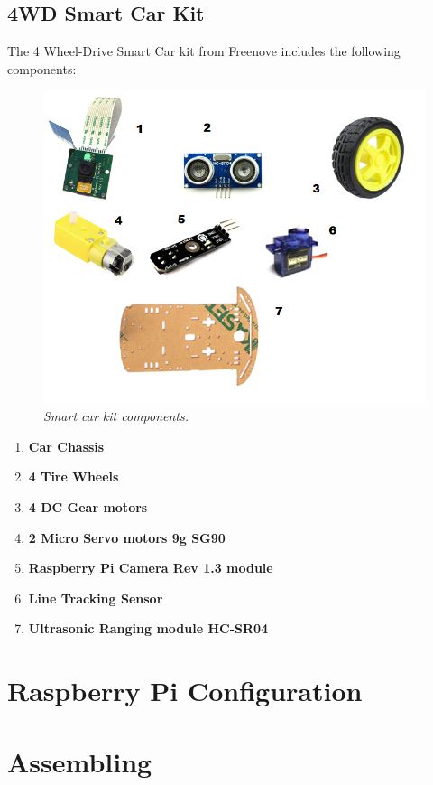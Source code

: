 \documentclass[12pt,a4paper]{article}
\begin{document}
    \subsection{4WD Smart Car Kit}
    The 4 Wheel-Drive Smart Car kit from Freenove includes the following components:
     \begin{figure}[h]
     	\centering
     	\includegraphics[width=0.6\linewidth]{Imm/Kit}
     	\caption{\textit{Smart car kit components.}}
     	\label{fig: Kit}
     \end{figure}
    \begin{enumerate}
    	\item \textbf{Car Chassis}
    	\item \textbf{4 Tire Wheels}
    	\item \textbf{4 DC Gear motors}
    	\item \textbf{2 Micro Servo motors 9g SG90}
    	\item \textbf{Raspberry Pi Camera Rev 1.3 module}
    	\item \textbf{Line Tracking Sensor}
    	\item \textbf{Ultrasonic Ranging module HC-SR04}
    \end{enumerate}
    	
    
	\section{Raspberry Pi Configuration}
	\section{Assembling}
	
\end{document}
